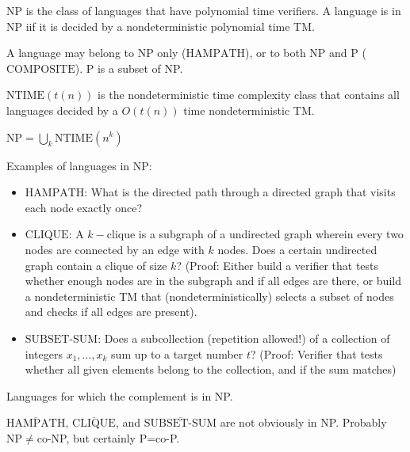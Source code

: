\documentclass[9pt, twocolumn]{extarticle}
\newcommand{\definition}[2]{%
  \begin{definitionbox}{\titlecap{#1}}
    #2
  \end{definitionbox}
}
\begin{document}
  \definition{The class NP}{NP is the class of languages that have polynomial time verifiers. A language is in NP iif it is decided by a nondeterministic polynomial time TM.}
  A language may belong to NP only ($\text{HAMPATH}$), or to both NP and P ($\text{COMPOSITE}$). P is a subset of NP.

  \definition{NTIME}{$\text{NTIME}(t(n))$ is the nondeterministic time complexity class that contains all languages decided by a $O(t(n))$ time nondeterministic TM.}

$\displaystyle\text{NP}=\bigcup_k \text{NTIME}(n^k)$

Examples of languages in NP:
\begin{itemize}
  \item $\text{HAMPATH}$: What is the directed path through a directed graph that visits each node exactly once?
  \item $\text{CLIQUE}$: A $k-\text{clique}$ is a subgraph of a undirected graph wherein every two nodes are connected by an edge with $k$ nodes. Does a certain undirected graph contain a clique of size $k$? (Proof: Either build a verifier that tests whether enough nodes are in the subgraph and if all edges are there, or build a nondeterministic TM that (nondeterministically) selects a subset of nodes and checks if all edges are present).
  \item $\text{SUBSET-SUM}$: Does a subcollection (repetition allowed!) of a collection of integers $x_1,\ldots,x_k$ sum up to a target number $t$? (Proof: Verifier that tests whether all given elements belong to the collection, and if the sum matches)
\end{itemize}

\definition{The Class \NoCaseChange{co-NP}}{Languages for which the complement is in NP.}

$\overline{\text{HAMPATH}}$, $\overline{\text{CLIQUE}}$, and $\overline{\text{SUBSET-SUM}}$ are not obviously in NP. Probably NP$\neq$co-NP, but certainly P=co-P.
\end{document}
